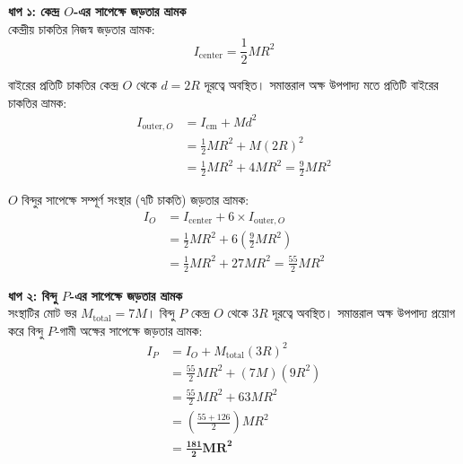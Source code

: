\documentclass[12pt, a4paper]{article}
\begin{document}
\begin{tcolorbox}[solutionbox={সমাধান (Solution)}]
    \noindent
    \textbf{ধাপ ১: কেন্দ্র $O$-এর সাপেক্ষে জড়তার ভ্রামক} \\
    কেন্দ্রীয় চাকতির নিজস্ব জড়তার ভ্রামক:
    \[ I_{\text{center}} = \frac{1}{2} M R^2 \]
    
    বাইরের প্রতিটি চাকতির কেন্দ্র $O$ থেকে $d = 2R$ দূরত্বে অবস্থিত। সমান্তরাল অক্ষ উপপাদ্য মতে প্রতিটি বাইরের চাকতির ভ্রামক:
    \begin{align*}
        I_{\text{outer}, O} &= I_{\text{cm}} + M d^2 \\
        &= \frac{1}{2} M R^2 + M (2R)^2 \\
        &= \frac{1}{2} M R^2 + 4 M R^2 = \frac{9}{2} M R^2
    \end{align*}
    
    $O$ বিন্দুর সাপেক্ষে সম্পূর্ণ সংস্থার (৭টি চাকতি) জড়তার ভ্রামক:
    \begin{align*}
        I_O &= I_{\text{center}} + 6 \times I_{\text{outer}, O} \\
        &= \frac{1}{2} M R^2 + 6 \left(\frac{9}{2} M R^2\right) \\
        &= \frac{1}{2} M R^2 + 27 M R^2 = \frac{55}{2} M R^2
    \end{align*}
    
    \vspace{0.5em}
    \noindent\textbf{ধাপ ২: বিন্দু $P$-এর সাপেক্ষে জড়তার ভ্রামক} \\
    সংস্থাটির মোট ভর $M_{\text{total}} = 7M$। 
    বিন্দু $P$ কেন্দ্র $O$ থেকে $3R$ দূরত্বে অবস্থিত। সমান্তরাল অক্ষ উপপাদ্য প্রয়োগ করে বিন্দু $P$-গামী অক্ষের সাপেক্ষে জড়তার ভ্রামক:
    \begin{align*}
        I_P &= I_O + M_{\text{total}} (3R)^2 \\
        &= \frac{55}{2} M R^2 + (7M) (9 R^2) \\
        &= \frac{55}{2} M R^2 + 63 M R^2 \\
        &= \left(\frac{55 + 126}{2}\right) M R^2 \\
        &= \mathbf{\frac{181}{2} M R^2}
    \end{align*}
\end{tcolorbox}

\newpage
\end{document}

